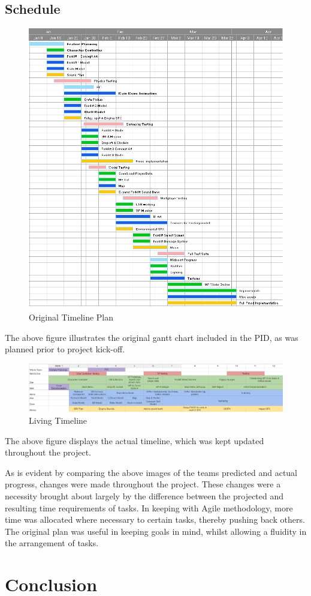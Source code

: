 \documentclass[12pt]{article}
\begin{document}
\subsection{Schedule} 
\begin{figure}[H]
	\caption{Original Timeline Plan}
	\includegraphics[width=\textwidth]{images/ganttChart}
\end{figure}
The above figure illustrates the original gantt chart included in the PID, as was planned prior to project kick-off. 
\begin{figure}[H]
	\caption{Living Timeline}
	\includegraphics[scale=0.4]{images/livingTimeline}
\end{figure}
The above figure displays the actual timeline, which was kept updated throughout the project. 

As is evident by comparing the above images of the teams predicted and actual progress, changes were made throughout the project. These changes were a necessity brought about largely by the difference between the projected and resulting time requirements of tasks. In keeping with Agile methodology, more time was allocated where necessary to certain tasks, thereby pushing back others. The original plan was useful in keeping goals in mind, whilst allowing a fluidity in the arrangement of tasks. 

\section{Conclusion}

\begin{appendix}
	
\end{appendix}
\end{document}
